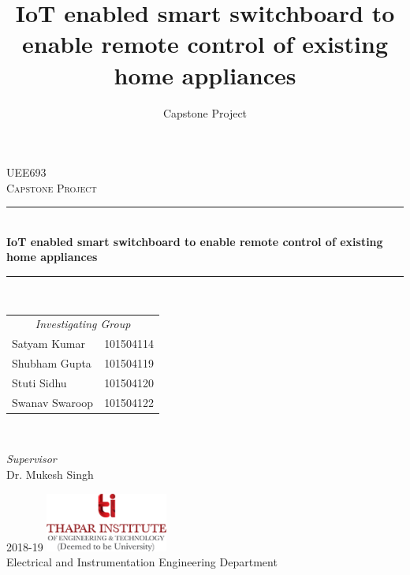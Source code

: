 \documentclass[12pt,a4paper,titlepage,twoside]{book}
\title{ IoT enabled smart switchboard to enable remote control of existing home appliances }
\author{Capstone Project}
\begin{document}
    \begin{titlepage} 
    	\newcommand{\HRule}{\rule{\linewidth}{0.4mm}}
    	\centering 
    	\textsc{\Large UEE693}\\[0.5cm] 
    	\textsc{\large Capstone Project}\\[0.5cm]
    	\HRule\\[0.4cm]
    	{\huge\bfseries IoT enabled smart switchboard to enable remote control of existing home appliances}\\[0.4cm]
    	\HRule\\[1.5cm]
    	\vfill
    	\begin{minipage}{0.5\textwidth}
    		\begin{flushleft}
    			\large
    			\begin{tabular}{l l}
    				\multicolumn{2}{c}{\textit{Investigating Group}} \\
    				Satyam Kumar   & 101504114 \\
    				Shubham Gupta  & 101504119 \\
    				Stuti Sidhu    & 101504120 \\
    				Swanav Swaroop & 101504122 \\
    			\end{tabular}
    			
    		\end{flushleft}
    	\end{minipage}
    	~
    	\begin{minipage}{0.4\textwidth}
    		\begin{flushright}
    			\large
    			\textit{Supervisor}\\
    			Dr. Mukesh Singh
    		\end{flushright}
    	\end{minipage}
    	\vfill\vfill\vfill
    	{\large 2018-19}		
    	\vfill\vfill
    	\includegraphics[width=0.3\textwidth]{logo.png}\\
    	Electrical and Instrumentation Engineering Department\\
    \end{titlepage}
    
    \setcounter{tocdepth}{1}
    \tableofcontents
    \newpage
    \frontmatter
	    
	    
	    
	    
	    
	    \newpage
	    
        
    \mainmatter
	    
	    
	    
	    
	    
	             
  
    \backmatter
    	
    	
    	
\end{document}
